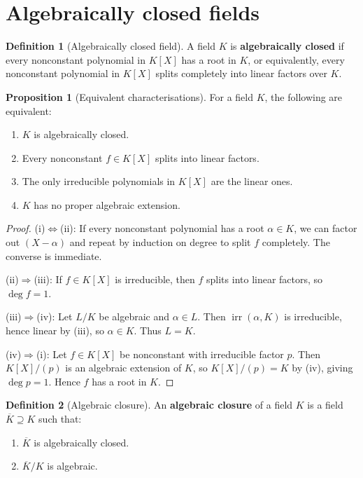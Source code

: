 \documentclass[12pt,a4paper,openany]{book}
\theoremstyle{definition}
\newtheorem{definition}{Definition}[chapter]
\newtheorem{proposition}{Proposition}[chapter]
\theoremstyle{remark}
\renewcommand{\deg}{\operatorname{deg}}
\DeclareMathOperator{\irr}{irr}
\begin{document}
\section{Algebraically closed fields}
\label{sec:alg-closed}

\begin{definition}[Algebraically closed field]
\label{def:alg-closed}
A field $K$ is \textbf{algebraically closed} if every nonconstant
polynomial in $K[X]$ has a root in $K$, or equivalently, every
nonconstant polynomial in $K[X]$ splits completely into linear factors
over $K$.
\end{definition}

\begin{proposition}[Equivalent characterisations]
\label{prop:alg-closed-equiv}
For a field $K$, the following are equivalent:
\begin{enumerate}[label=(\roman*)]
  \item $K$ is algebraically closed.
  \item Every nonconstant $f \in K[X]$ splits into linear factors.
  \item The only irreducible polynomials in $K[X]$ are the linear ones.
  \item $K$ has no proper algebraic extension.
\end{enumerate}
\end{proposition}

\begin{proof}
(i)$\Leftrightarrow$(ii): If every nonconstant polynomial has a root
$\alpha \in K$, we can factor out $(X-\alpha)$ and repeat by
induction on degree to split $f$ completely. The converse is
immediate.

(ii)$\Rightarrow$(iii): If $f \in K[X]$ is irreducible, then $f$
splits into linear factors, so $\deg f = 1$.

(iii)$\Rightarrow$(iv): Let $L/K$ be algebraic and $\alpha \in L$.
Then $\irr(\alpha, K)$ is irreducible, hence linear by (iii), so
$\alpha \in K$. Thus $L = K$.

(iv)$\Rightarrow$(i): Let $f \in K[X]$ be nonconstant with
irreducible factor $p$. Then $K[X]/(p)$ is an algebraic extension
of $K$, so $K[X]/(p) = K$ by (iv), giving $\deg p = 1$. Hence $f$
has a root in $K$.
\end{proof}

\begin{definition}[Algebraic closure]
\label{def:alg-closure}
An \textbf{algebraic closure} of a field $K$ is a field
$\overline{K} \supseteq K$ such that:
\begin{enumerate}[label=(\roman*)]
  \item $\overline{K}$ is algebraically closed.
  \item $\overline{K}/K$ is algebraic.
\end{enumerate}
\end{definition}
\end{document}
